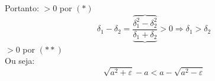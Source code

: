 \documentclass[12pt]{article}
\begin{document}
\vspace{0.2cm}\\
Portanto:
\vspace{-0.5cm}
\hspace{4.2cm} \(>0\) \hspace{0.2cm} por \hspace{0.2cm}\((\ast)\)\\
\[\delta_1-\delta_2=\frac{\overbrace{\delta_1^2-\delta_2^2}}{\underbrace{\delta_1+\delta_2}}>0\Rightarrow\delta_1>\delta_2\]
\vspace{-0.2cm}
\hspace{6cm} \(>0\) \hspace{0.2cm} por \hspace{0.2cm}\((\ast\ast)\)\\

Ou seja:
\[\sqrt{a^2+\varepsilon}-a<a-\sqrt{a^2-\varepsilon}\]
\vspace{0.2cm}\\
\end{document}
